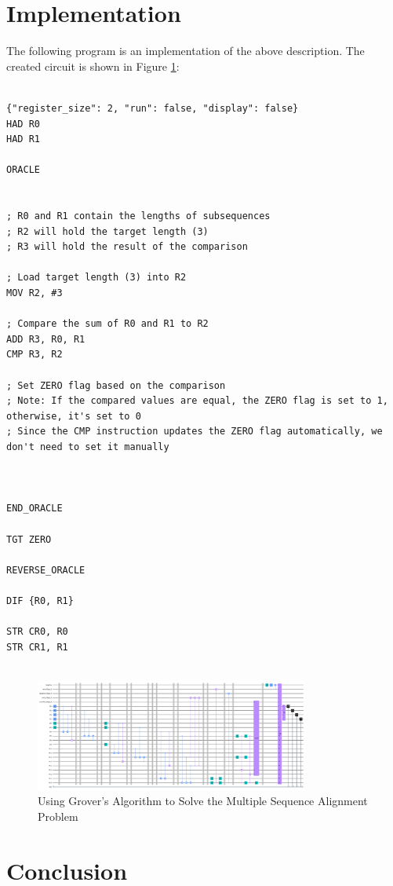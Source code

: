\section{Implementation}

The following program is an implementation of the above description. The created circuit is shown in Figure \ref{fig:Multiple_Sequence_Alignment}:

\begin{lstlisting}

{"register_size": 2, "run": false, "display": false}
HAD R0
HAD R1

ORACLE


; R0 and R1 contain the lengths of subsequences
; R2 will hold the target length (3)
; R3 will hold the result of the comparison

; Load target length (3) into R2
MOV R2, #3

; Compare the sum of R0 and R1 to R2
ADD R3, R0, R1
CMP R3, R2

; Set ZERO flag based on the comparison
; Note: If the compared values are equal, the ZERO flag is set to 1, otherwise, it's set to 0
; Since the CMP instruction updates the ZERO flag automatically, we don't need to set it manually



END_ORACLE

TGT ZERO

REVERSE_ORACLE

DIF {R0, R1}

STR CR0, R0
STR CR1, R1


\end{lstlisting}

\begin{figure}[htp]
    \centering
    \includegraphics[width=9cm]{Figures/Multiple_Sequence_Alignment_circuit.png}
    \caption{Using Grover's Algorithm to Solve the Multiple Sequence Alignment Problem}
    \label{fig:Multiple_Sequence_Alignment}
\end{figure}

\section{Conclusion}
\label{sec:conclusion}

